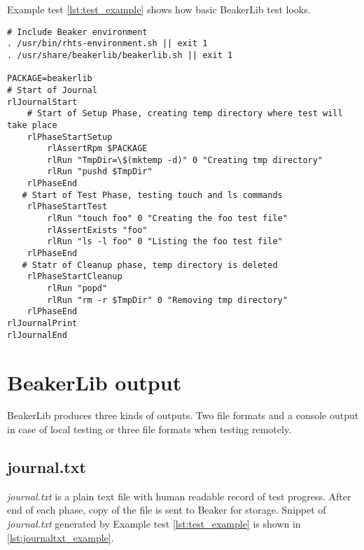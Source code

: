 Example test \ref{lst:test_example} shows how basic BeakerLib test looks.

\begin{minipage}{\linewidth}
\begin{lstlisting}[style=beakerlib_bash,caption={Example of basic BeakerLib test},label={lst:test_example}]
# Include Beaker environment
. /usr/bin/rhts-environment.sh || exit 1
. /usr/share/beakerlib/beakerlib.sh || exit 1

PACKAGE=beakerlib
# Start of Journal
rlJournalStart
    # Start of Setup Phase, creating temp directory where test will take place 
    rlPhaseStartSetup
        rlAssertRpm $PACKAGE
        rlRun "TmpDir=\$(mktemp -d)" 0 "Creating tmp directory"
        rlRun "pushd $TmpDir"
    rlPhaseEnd
   # Start of Test Phase, testing touch and ls commands
    rlPhaseStartTest
        rlRun "touch foo" 0 "Creating the foo test file"
        rlAssertExists "foo"
        rlRun "ls -l foo" 0 "Listing the foo test file"
    rlPhaseEnd
   # Statr of Cleanup phase, temp directory is deleted
    rlPhaseStartCleanup
        rlRun "popd"
        rlRun "rm -r $TmpDir" 0 "Removing tmp directory"
    rlPhaseEnd
rlJournalPrint
rlJournalEnd
\end{lstlisting}
\end{minipage}

\section{BeakerLib output}
BeakerLib produces three kinds of outputs. Two file formats and a console output in case of local testing or three file formats when testing remotely.

\subsection{journal.txt}
\textit{journal.txt} is a plain text file with human readable record of test progress. After end of each phase, copy of the file is sent to Beaker for storage. Snippet of \textit{journal.txt} generated by Example test \ref{lst:test_example} is shown in \ref{lst:journaltxt_example}.

